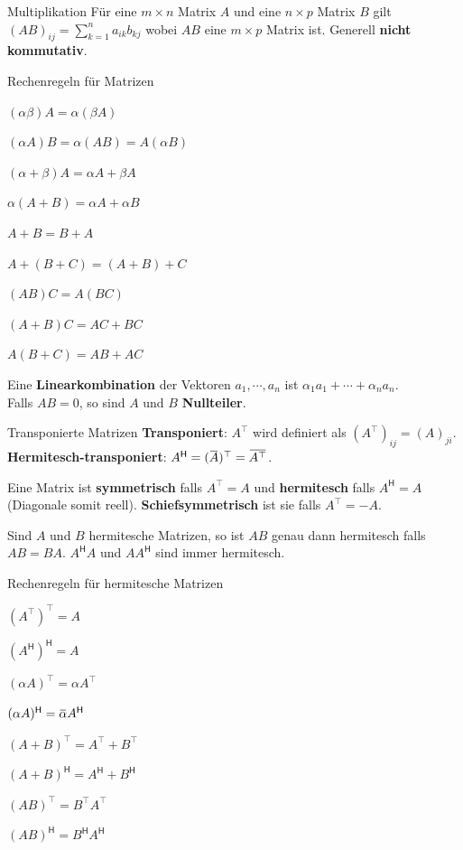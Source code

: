 \documentclass[a4paper,10pt]{article}
\newcommand*{\hermconj}{\mathsf{H}}
\newcommand{\overbar}[1]{\mkern 1.5mu\overline{\mkern-1.5mu#1\mkern-1.5mu}\mkern 1.5mu}
\begin{document}
\begin{subbox}{Multiplikation}
  Für eine $m \times n$ Matrix $A$ und eine $n \times p$ Matrix $B$ gilt $(AB)_{ij} = \sum_{k=1}^n a_{ik} b_{kj}$ wobei $AB$ eine $m \times p$ Matrix ist. Generell \textbf{nicht kommutativ}.
\end{subbox}

\begin{subbox}{Rechenregeln für Matrizen}
  \begin{rowlist}
    \item $(\alpha \beta)A = \alpha(\beta A)$
    \item $(\alpha A)B = \alpha(AB) = A(\alpha B)$
    \item $(\alpha + \beta)A = \alpha A + \beta A$
    \item $\alpha(A + B) = \alpha A + \alpha B$
    \item $A + B = B + A$
    \item $A + (B + C) = (A + B) + C$
    \item $(AB)C = A(BC)$
    \item $(A + B)C = AC + BC$
    \item $A(B + C) = AB + AC$
  \end{rowlist}
\end{subbox}

Eine \textbf{Linearkombination} der Vektoren $a_1, \cdots, a_n$ ist $\alpha_1 a_1 + \cdots + \alpha_n a_n$.\\
Falls $AB = 0$, so sind $A$ und $B$ \textbf{Nullteiler}.\\
\begin{subbox}{Transponierte Matrizen}
  \textbf{Transponiert}: $A^\top$ wird definiert als $(A^\top)_{ij} = (A)_{ji}$.\\
  \textbf{Hermitesch-transponiert}: $A^\hermconj = (\overbar{A})^\top = \overbar{A^\top}$.
\end{subbox}
Eine Matrix ist \textbf{symmetrisch} falls $A^\top = A$ und \textbf{hermitesch} falls $A^\hermconj = A$ (Diagonale somit reell). \textbf{Schiefsymmetrisch} ist sie falls $A^\top = -A$. 

Sind $A$ und $B$ hermitesche Matrizen, so ist $AB$ genau dann hermitesch falls $AB = BA$. $A^\hermconj A$ und $A A^\hermconj$ sind  immer hermitesch.

\begin{subbox}{Rechenregeln für hermitesche Matrizen}
  \begin{rowlist}
    \item $(A^\top)^\top = A$
    \item $(A^\hermconj)^\hermconj = A$
    \item $(\alpha A)^\top = \alpha A^\top$
    \item $(\alpha A)^\hermconj = \overbar{\alpha} A^\hermconj$
    \item $(A + B)^\top = A^\top + B^\top$
    \item $(A + B)^\hermconj = A^\hermconj + B^\hermconj$
    \item $(AB)^\top = B^\top A^\top$
    \item $(AB)^\hermconj = B^\hermconj A^\hermconj$
  \end{rowlist}
\end{subbox}
\end{document}
